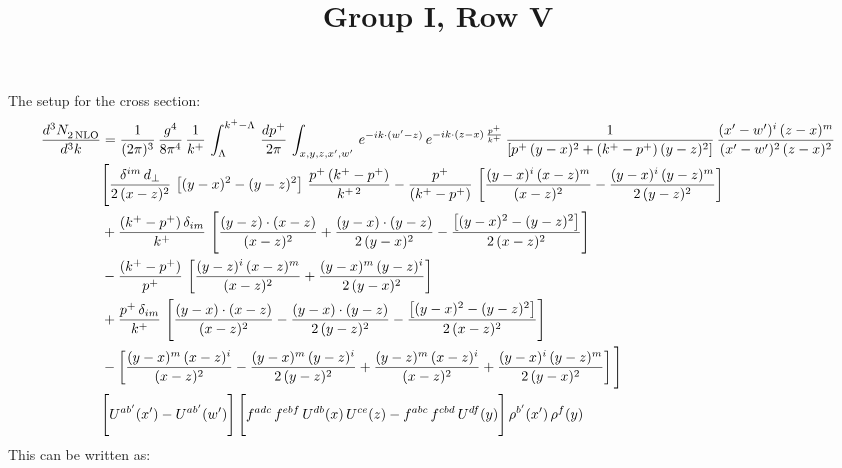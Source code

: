 \documentclass[9pt]{article}
\title{Group I, Row V}
\author{}
\date{}
\numberwithin{equation}{section}
\begin{document}
\maketitle
The setup for the cross section: 
\begin{align}
    \frac{d^{3}N_{2\,\rm NLO}^{\rm}}{d^{3}k}  & =  \frac{1}{(2\pi)^{3}}\,\frac{g^{4}}{8\pi^{4}}\,\frac{1}{k^{+}}\,\int_{\Lambda}^{k^{+}-\Lambda}\, \frac{dp^{+}}{2\pi} \,\int_{x,y,z,x',w'}\,e^{-ik\cdot(w'-z)}\,e^{-ik\cdot (z-x)\,\frac{p^{+}}{k^{+}}}\,\frac{1}{\left[p^{+}\,(y-x)^{2}+(k^{+}-p^{+})\,(y-z)^{2}\right]}\, \frac{(x'-w')^{i}\,(z-x)^{m}}{(x'-w')^{2}\,(z-x)^{2}} \notag \\ & \Bigg[\frac{\delta^{im}\,d_{\perp}}{2\,(x-z)^{2}}\,\left[(y-x)^{2}-(y-z)^{2}\right]\,\frac{p^{+}\,(k^{+}-p^{+})}{k^{+\,2}}-\frac{p^{+}}{(k^{+}-p^{+})}\,\left[\frac{(y-x)^{i}\,(x-z)^{m}}{(x-z)^{2}}-\frac{(y-x)^{i}\,(y-z)^{m}}{2\,(y-z)^{2}}\right]\notag \\ & +\frac{(k^{+}-p^{+})\,\delta_{im}}{k^{+}}\,\left[\frac{(y-z)\cdot (x-z)}{(x-z)^{2}}+\frac{(y-x)\cdot (y-z)}{2\,(y-x)^{2}}-\frac{\left[(y-x)^{2}-(y-z)^{2}\right]}{2\,(x-z)^{2}}\right]\notag \\ & -\frac{(k^{+}-p^{+})}{p^{+}}\,\left[\frac{(y-z)^{i}\,(x-z)^{m}}{(x-z)^{2}}+\frac{(y-x)^{m}\,(y-z)^{i}}{2\,(y-x)^{2}}\right]\notag \\ & +\frac{p^{+}\,\delta_{im}}{k^{+}}\,\left[\frac{(y-x)\cdot (x-z)}{(x-z)^{2}}-\frac{(y-x)\cdot (y-z)}{2\,(y-z)^{2}}-\frac{\left[(y-x)^{2}-(y-z)^{2}\right]}{2\,(x-z)^{2}}\right]\notag \\ &-\left[\frac{(y-x)^{m}\,(x-z)^{i}}{(x-z)^{2}}-\frac{(y-x)^{m}\,(y-z)^{i}}{2\,(y-z)^{2}}+\frac{(y-z)^{m}\,(x-z)^{i}}{(x-z)^{2}}+\frac{(y-x)^{i}\,(y-z)^{m}}{2\,(y-x)^{2}}\right]\Bigg] \notag \\ & \Bigg[U^{ab'}(x')-U^{ab'}(w')\Bigg]\,\Bigg[f^{adc}\,f^{ebf}\,U^{db}(x)\,U^{ce}(z)-f^{abc}\,f^{cbd}\,U^{df}(y)\Bigg]\,\rho^{b'}(x')\,\rho^{f}(y)
\end{align}
This can be written as: 
\end{document}
